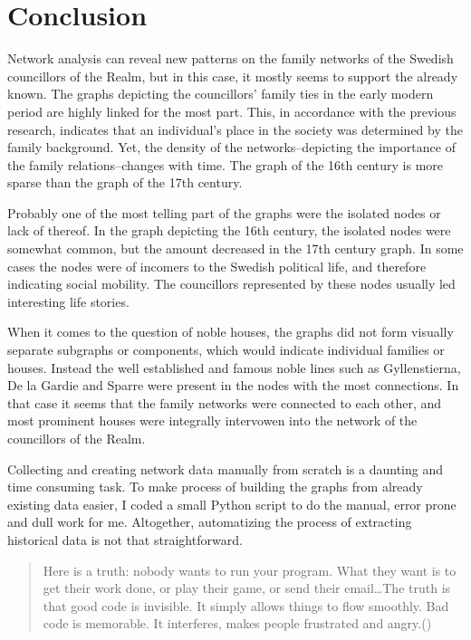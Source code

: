 \section{Conclusion}
Network analysis can reveal new patterns on the family networks of the Swedish councillors of the Realm, but in this case, it mostly seems to support the already known. The graphs depicting the councillors' family ties in the early modern period are highly linked for the most part. This, in accordance with the previous research, indicates that an individual's place in the society was determined by the family background. Yet, the density of the networks–depicting the importance of the family relations–changes with time. The graph of the 16th century is more sparse than the graph of the 17th century.

Probably one of the most telling part of the graphs were the isolated nodes or lack of thereof. In the graph depicting the 16th century, the isolated nodes were somewhat common, but the amount decreased in the 17th century graph. In some cases the nodes were of incomers to the Swedish political life, and therefore indicating social mobility. The councillors represented by these nodes usually led interesting life stories.

When it comes to the question of noble houses, the graphs did not form visually separate subgraphs or components, which would indicate individual families or houses. Instead the well established and famous noble lines such as Gyllenstierna, De la Gardie and Sparre were present in the nodes with the most connections. In that case it seems that the family networks were connected to each other, and most prominent houses were integrally intervowen into the network of the councillors of the Realm.

Collecting and creating network data manually from scratch is a daunting and time consuming task. To make process of building the graphs from already existing data easier, I coded a small Python script to do the manual, error prone and dull work for me. Altogether, automatizing the process of extracting historical data is not that straightforward.

\begin{quote}
	Here is a truth: nobody wants to run your program. What they want is to get their work done, or play their game, or send their email\ldots The truth is that good code is invisible. It simply allows things to flow smoothly. Bad code is memorable. It interferes, makes people frustrated and angry.(\cite[prefix p. XVI]{python})
\end{quote}


